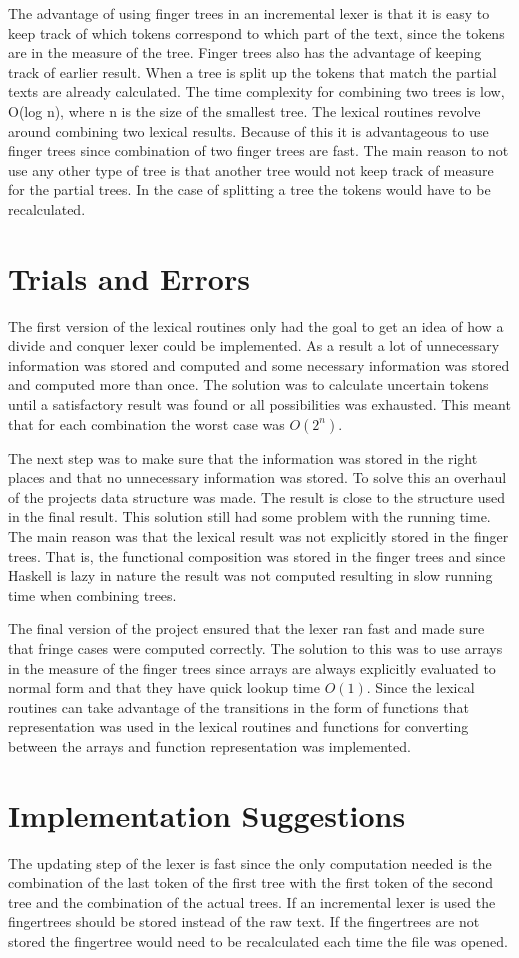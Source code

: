 The advantage of using finger trees in an incremental lexer is that it is easy
to keep track of which tokens correspond to which part of the text, since the
tokens are in the measure of the tree. Finger trees
also has the advantage of keeping track of earlier result. When a tree is split
up the tokens that match the partial texts are already calculated. The time
complexity for combining two trees is low, O(log n), where n is the size of the
smallest tree. The lexical routines revolve around combining two lexical
results. Because of this it is advantageous to use finger trees since combination
of two finger trees are fast. The main reason to not use any other type of tree
is that another tree would not keep track of measure for the partial trees. In
the case of splitting a tree the tokens would have to be recalculated.

\section{Trials and Errors}
The first version of the lexical routines only had the goal to get an idea of
how a divide and conquer lexer could be implemented. As a result a lot of
unnecessary information was stored and computed and some necessary information
was stored and computed more than once. The solution was to calculate
uncertain tokens until a satisfactory result was found or all possibilities was
exhausted. This meant that for each combination the worst case was $O(2^n)$.

The next step was to make sure that the information was stored in the right
places and that no unnecessary information was stored. To solve this an overhaul
of the projects data structure was made. The result is close to the structure
used in the final result. This solution still had some problem with the running
time. The main reason was that the lexical result was not explicitly stored in
the finger trees. That is, the functional composition was stored in the finger
trees and since Haskell is lazy in nature the result was not computed resulting
in slow running time when combining trees.

The final version of the project ensured that the lexer ran fast and made
sure that fringe cases were computed correctly. The solution to this was to use
arrays in the measure of the finger trees since arrays are always explicitly
evaluated to normal form and that they have quick lookup time $O(1)$. Since the
lexical routines can take advantage of the transitions in the form of functions
that representation was used in the lexical routines and functions for
converting between the arrays and function representation was implemented.

\section{Implementation Suggestions}
The updating step of the lexer is fast since the only computation needed is the
combination of the last token of the first tree with the first token of the
second tree and the combination of the actual trees. If an incremental lexer is
used the fingertrees should be stored instead of the raw text. If the
fingertrees are not stored the fingertree would need to be recalculated each
time the file was opened.
